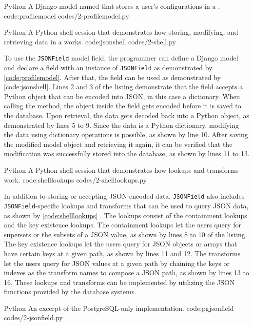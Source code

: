 \listing
{Python}
{A Django model named  that stores a user's configurations in a
.}
{code:profilemodel}
{codes/2-profilemodel.py}

\listing
{Python}
{A Python shell session that demonstrates how storing, modifying, and
retrieving data in a  works.}
{code:jsonshell}
{codes/2-shell.py}

To use the \verb|JSONField| model field, the programmer can define a Django
model and declare a field with an instance of \verb|JSONField| as demonstrated
by \autoref{code:profilemodel}. After that, the field can be used as
demonstrated by \autoref{code:jsonshell}. Lines 2 and 3 of the listing
demonstrate that the field accepts a Python object that can be encoded into
JSON, in this case a dictionary. When calling the  method, the
object inside the field gets encoded before it is saved to the database. Upon
retrieval, the data gets decoded back into a Python object, as demonstrated by
lines 5 to 9. Since the data is a Python dictionary, modifying the data using
dictionary operations is possible, as shown by line 10. After saving the
modified model object and retrieving it again, it can be verified that the
modification was successfully stored into the database, as shown by lines 11 to
13.

\listing
{Python}
{A Python shell session that demonstrates how  lookups and
transforms work.}
{code:shelllookups}
{codes/2-shelllookups.py}

In addition to storing or accepting JSON-encoded data, \verb|JSONField| also
includes \verb|JSONField|-specific lookups and transforms that can be used to
query JSON data, as shown by \autoref{code:shelllookups}
\cite{django30_modeljsonfield}. The lookups consist of the containment
lookups and the key existence lookups. The containment lookups let the users
query for supersets or the subsets of a JSON value, as shown by lines 8 to 10
of the listing. The key existence lookups let the users query for JSON objects
or arrays that have certain keys at a given path, as shown by lines 11 and 12.
The transforms let the users query for JSON values at a given path by chaining
the keys or indexes as the transform names to compose a JSON path, as shown by
lines 13 to 16. These lookups and transforms can be implemented by utilizing
the JSON functions provided by the database systems.

\listing
{Python}
{An excerpt of the PostgreSQL-only  implementation.}
{code:pgjsonfield}
{codes/2-jsonfield.py}

